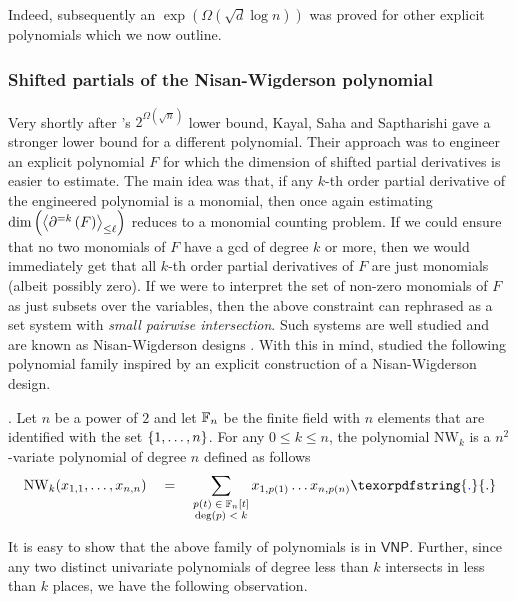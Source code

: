 \documentclass{birkjour}
\newcommand{\spaced}[1]{\quad#1\quad}
\newcommand{\SPD}[3]{\inangle{\partial^{=#1}\inparen{#3}}_{\leq #2}}
\providecommand{\DIFaddtex}[1]{{\protect\color{blue}\uwave{#1}}} %
\providecommand{\DIFaddbegin}{} %
\providecommand{\DIFaddend}{} %
\providecommand{\DIFadd}[1]{\texorpdfstring{\DIFaddtex{#1}}{#1}} %
\begin{document}
Indeed, subsequently an $\exp(\Omega(\sqrt{d}\log n))$ was proved \cite{KSS13,FLMS13} for other explicit polynomials  which we now outline. 

\subsubsection{Shifted partials of the Nisan-Wigderson polynomial}

Very shortly after \cite{gkks13}'s $2^{\Omega(\sqrt{n})}$ lower bound, Kayal, Saha and Saptharishi \cite{KSS13} gave a stronger lower bound for a different polynomial. Their approach was to engineer an explicit polynomial $F$ for which the dimension of shifted partial derivatives is easier to estimate. The main idea was that, if any $k$-th order partial derivative of the engineered polynomial is a monomial, then once again estimating $\dim\inparen{\SPD{k}{\ell}{F}}$ reduces to a monomial counting problem. If we could ensure that no two monomials of $F$ have a gcd of degree $k$ or more, then we would immediately get that all $k$-th order partial derivatives of $F$ are just monomials (albeit possibly zero). If we were to interpret the set of non-zero monomials of $F$ as just subsets over the variables, then the above constraint can \DIFaddbegin \DIFadd{be }\DIFaddend rephrased as a set system with \emph{small pairwise intersection}. Such systems are well studied and are known as Nisan-Wigderson designs \cite{nw94}.  With this in mind, \cite{KSS13} studied the following polynomial family inspired by an explicit construction of a Nisan-Wigderson design. 

\begin{definition}. 
Let $n$ be a power of $2$ and let $\mathbb{F}_n$ be the finite field with $n$ elements that are identified with the set $\left\{1,\dots, n\right\}$. For any $0\leq k \leq n$, the polynomial $\mathrm{NW}_k$ is a $n^2$-variate polynomial of degree $n$ defined as follows\DIFaddbegin \DIFadd{:
}\DIFaddend $$
\mathrm{NW}_k(x_{1,1},\dots, x_{n,n}) \spaced{=} \sum_{\substack{p(t) \;\in\; \F_n[t]\\\deg(p) \;<\; k}} x_{1,p(1)}\dots x_{n,p(n)}\DIFaddbegin \DIFadd{.
}\DIFaddend $$
\end{definition}

It is easy to show that the above family of polynomials is in $\mathsf{VNP}$. Further, since any two distinct univariate polynomials of degree less than $k$ intersects in less than $k$ places, we have the following observation. 
\end{document}
